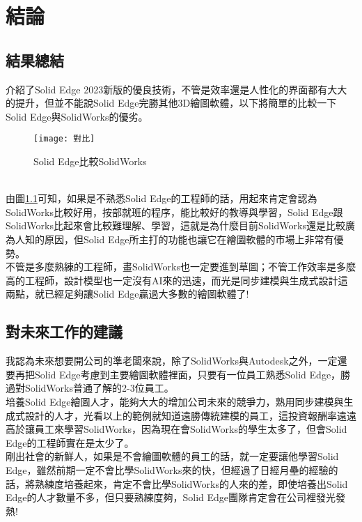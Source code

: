 \chapter{結論}
\section{結果總結}
 介紹了Solid Edge 2023新版的優良技術，不管是效率還是人性化的界面都有大大的提升，但並不能說Solid Edge完勝其他3D繪圖軟體，以下將簡單的比較一下Solid Edge與SolidWorks的優劣。\\
 \begin{figure}[hbt!]
\begin{center}
\texttt{[image: 對比]}
\caption{\Large Solid Edge比較SolidWorks}\label{5.0}
\end{center}
\end{figure}
\\

 由圖\ref{5.0}可知，如果是不熟悉Solid Edge的工程師的話，用起來肯定會認為SolidWorks比較好用，按部就班的程序，能比較好的教導與學習，Solid Edge跟SolidWorks比起來會比較難理解、學習，這就是為什麼目前SolidWorks還是比較廣為人知的原因，但Solid Edge所主打的功能也讓它在繪圖軟體的市場上非常有優勢。\\
 
 不管是多麼熟練的工程師，畫SolidWorks也一定要進到草圖；不管工作效率是多麼高的工程師，設計模型也一定沒有AI來的迅速，而光是同步建模與生成式設計這兩點，就已經足夠讓Solid Edge贏過大多數的繪圖軟體了!\\
 
 
\section{對未來工作的建議}
我認為未來想要開公司的準老闆來說，除了SolidWorks與Autodesk之外，一定還要再把Solid Edge考慮到主要繪圖軟體裡面，只要有一位員工熟悉Solid Edge，勝過對SolidWorks普通了解的2-3位員工。\\

培養Solid Edge繪圖人才，能夠大大的增加公司未來的競爭力，熟用同步建模與生成式設計的人才，光看以上的範例就知道遠勝傳統建模的員工，這投資報酬率遠遠高於讓員工來學習SolidWorks，因為現在會SolidWorks的學生太多了，但會Solid Edge的工程師實在是太少了。\\

剛出社會的新鮮人，如果是不會繪圖軟體的員工的話，就一定要讓他學習Solid Edge，雖然前期一定不會比學SolidWorks來的快，但經過了日經月壘的經驗的話，將熟練度培養起來，肯定不會比學SolidWorks的人來的差，即使培養出Solid Edge的人才數量不多，但只要熟練度夠，Solid Edge團隊肯定會在公司裡發光發熱!\\


\newpage